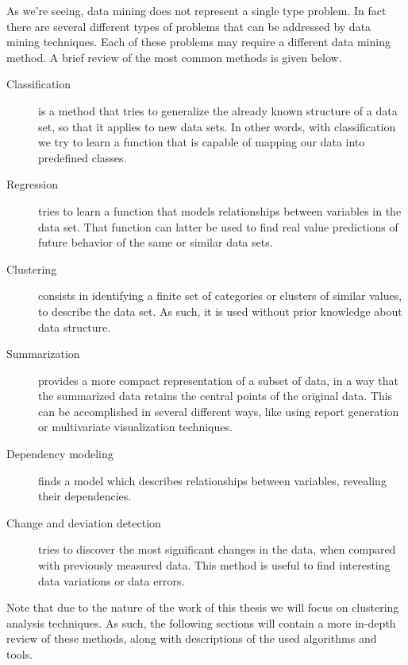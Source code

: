As we're seeing, data mining does not represent a single type problem. In fact
there are several different types of problems that can be addressed by data
mining techniques. Each of these problems may require a different data mining
method. A brief review of the most common methods is given below.

\begin{description}

  \item[Classification]
  is a method that tries to generalize the already known structure of a
  data set, so that it applies to new data sets. In other words, with
  classification we try to learn a function that is capable of mapping our data
  into predefined classes.

  \item[Regression]
  tries to learn a function that models relationships between variables in the
  data set. That function can latter be used to find real value predictions of
  future behavior of the same or similar data sets.

  \item[Clustering]
  consists in identifying a finite set of categories or clusters of similar
  values, to describe the data set. As such, it is used without prior knowledge
  about data structure.

  \item[Summarization]
  provides a more compact representation of a subset of data, in a way that the
  summarized data retains the central points of the original data. This can be
  accomplished in several different ways, like using report generation or
  multivariate visualization techniques.

  \item[Dependency modeling]
  finds a model which describes relationships between variables, revealing their
  dependencies.

  \item[Change and deviation detection]
  tries to discover the most significant changes in the data, when compared with
  previously measured data. This method is useful to find interesting data
  variations or data errors.

\end{description}

Note that due to the nature of the work of this thesis we will focus on
clustering analysis techniques. As such, the following sections will contain a
more in-depth review of these methods, along with descriptions of the used
algorithms and tools.

